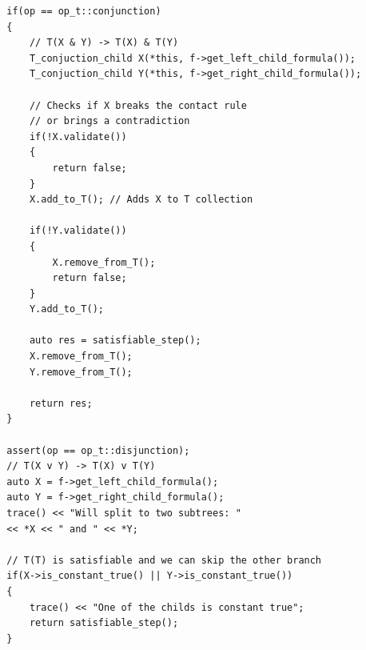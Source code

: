 \documentclass{article}
\begin{document}
\begin{lstlisting}
        if(op == op_t::conjunction)
        {
            // T(X & Y) -> T(X) & T(Y)
            T_conjuction_child X(*this, f->get_left_child_formula());
            T_conjuction_child Y(*this, f->get_right_child_formula());

            // Checks if X breaks the contact rule
            // or brings a contradiction
            if(!X.validate())
            {
                return false;
            }
            X.add_to_T(); // Adds X to T collection

            if(!Y.validate())
            {
                X.remove_from_T();
                return false;
            }
            Y.add_to_T();

            auto res = satisfiable_step();
            X.remove_from_T();
            Y.remove_from_T();

            return res;
        }

        assert(op == op_t::disjunction);
        // T(X v Y) -> T(X) v T(Y)
        auto X = f->get_left_child_formula();
        auto Y = f->get_right_child_formula();
        trace() << "Will split to two subtrees: "
		<< *X << " and " << *Y;

        // T(T) is satisfiable and we can skip the other branch
        if(X->is_constant_true() || Y->is_constant_true())
        {
            trace() << "One of the childs is constant true";
            return satisfiable_step();
        }
\end{lstlisting}
\newpage
\end{document}
